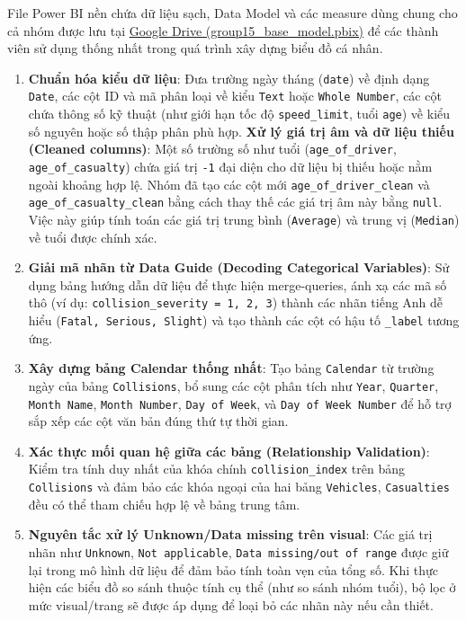 File Power BI nền chứa dữ liệu sạch, Data Model và các measure dùng chung cho cả nhóm được lưu tại \href{https://drive.google.com/drive/folders/1sywfP6Y0LKDpIVAWVs_C1WCiwlf-ybZ6?usp=drive_link}{Google Drive (group15\_base\_model.pbix)} để các thành viên sử dụng thống nhất trong quá trình xây dựng biểu đồ cá nhân.

\begin{enumerate}
    \item \textbf{Chuẩn hóa kiểu dữ liệu}: Đưa trường ngày tháng (\texttt{date}) về định dạng \texttt{Date}, các cột ID và mã phân loại về kiểu \texttt{Text} hoặc \texttt{Whole Number}, các cột chứa thông số kỹ thuật (như giới hạn tốc độ \texttt{speed\_limit}, tuổi \texttt{age}) về kiểu số nguyên hoặc số thập phân phù hợp.
    \textbf{Xử lý giá trị âm và dữ liệu thiếu (Cleaned columns)}: Một số trường số như tuổi (\texttt{age\_of\_driver}, \texttt{age\_of\_casualty}) chứa giá trị \texttt{-1} đại diện cho dữ liệu bị thiếu hoặc nằm ngoài khoảng hợp lệ. Nhóm đã tạo các cột mới \texttt{age\_of\_driver\_clean} và \texttt{age\_of\_casualty\_clean} bằng cách thay thế các giá trị âm này bằng \texttt{null}. Việc này giúp tính toán các giá trị trung bình (\texttt{Average}) và trung vị (\texttt{Median}) về tuổi được chính xác.
    \item \textbf{Giải mã nhãn từ Data Guide (Decoding Categorical Variables)}: Sử dụng bảng hướng dẫn dữ liệu để thực hiện merge-queries, ánh xạ các mã số thô (ví dụ: \texttt{collision\_severity = 1, 2, 3}) thành các nhãn tiếng Anh dễ hiểu (\texttt{Fatal, Serious, Slight}) và tạo thành các cột có hậu tố \texttt{\_label} tương ứng.
    \item \textbf{Xây dựng bảng Calendar thống nhất}: Tạo bảng \texttt{Calendar} từ trường ngày của bảng \texttt{Collisions}, bổ sung các cột phân tích như \texttt{Year}, \texttt{Quarter}, \texttt{Month Name}, \texttt{Month Number}, \texttt{Day of Week}, và \texttt{Day of Week Number} để hỗ trợ sắp xếp các cột văn bản đúng thứ tự thời gian.
    \item \textbf{Xác thực mối quan hệ giữa các bảng (Relationship Validation)}: Kiểm tra tính duy nhất của khóa chính \texttt{collision\_index} trên bảng \texttt{Collisions} và đảm bảo các khóa ngoại của hai bảng \texttt{Vehicles}, \texttt{Casualties} đều có thể tham chiếu hợp lệ về bảng trung tâm.
    \item \textbf{Nguyên tắc xử lý Unknown/Data missing trên visual}: Các giá trị nhãn như \texttt{Unknown}, \texttt{Not applicable}, \texttt{Data missing/out of range} được giữ lại trong mô hình dữ liệu để đảm bảo tính toàn vẹn của tổng số. Khi thực hiện các biểu đồ so sánh thuộc tính cụ thể (như so sánh nhóm tuổi), bộ lọc ở mức visual/trang sẽ được áp dụng để loại bỏ các nhãn này nếu cần thiết.
\end{enumerate}
